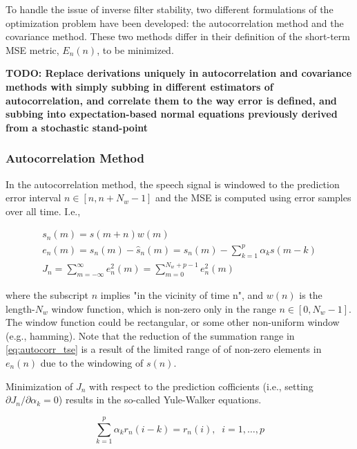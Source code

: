 To handle the issue of inverse filter stability, two different formulations of the optimization problem have been developed: the autocorrelation method and the covariance method. These two methods differ in their definition of the short-term MSE metric, $E_n(n)$, to be minimized. 


\textbf{TODO: Replace derivations uniquely in autocorrelation and covariance methods with simply subbing in different estimators of autocorrelation, and correlate them to the way error is defined, and subbing into expectation-based normal equations previously derived from a stochastic stand-point}

\subsubsection{Autocorrelation Method} \label{lp_autocor}

In the autocorrelation method, the speech signal is windowed to the prediction error interval $n \in [n, n+N_w-1]$ and the MSE is computed using error samples over all time. I.e.,

\begin{eqnarray}
	s_n(m) = s(m+n)w(m) \\
	e_n(m) = s_n(m) - \hat{s}_n(m) = s_n(m) - \sum_{k=1}^{p} \alpha_k s(m-k) \\
	J_n = \sum_{m=-\infty}^{\infty}e_n^2(m) = \sum_{m=0}^{N_w+p-1}e_n^2(m) \label{eq:autocorr_tse}
\end{eqnarray}

\noindent
where the subscript $n$ implies "in the vicinity of time n", and $w(n)$ is the length-$N_w$ window function, which is non-zero only in the range $n \in [0, N_w-1]$. The window function could be rectangular, or some other non-uniform window (e.g., hamming). Note that the reduction of the summation range in \ref{eq:autocorr_tse} is a result of the limited range of of non-zero elements in $e_n(n)$ due to the windowing of $s(n)$.

Minimization of $J_n$ with respect to the prediction cofficients (i.e., setting $\partial J_n  /\partial \alpha_k=0$) results in the so-called Yule-Walker equations. 

\begin{equation}
	\sum_{k=1}^{p} \alpha_k r_n(i-k) = r_n(i), \;\; i=1,\dots,p
\end{equation}


